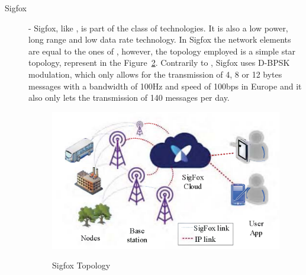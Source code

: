 \begin{description}
\begin{figure}[H]
                  \label{fig:lora_topology}
            \end{figure}
      \item[Sigfox] - Sigfox, like , is part of the  class
            of technologies. It is also a low power, long range and low data rate technology.
            In Sigfox the network elements are equal to the ones of , however,
            the topology employed is a simple star topology, represent in the
            Figure~\ref{fig:sigfox_topology}. Contrarily to , Sigfox uses
            \Gls{D-BPSK} modulation, which only allows for the transmission of 4, 8 or 12 bytes
            messages with a bandwidth of 100Hz and speed of 100bps in Europe and it also only
            lets the transmission of 140 messages per day.
            \begin{figure}[H]
                  \caption{Sigfox Topology \cite{Petrariu2021}}
                  \centering
                  \includegraphics[scale=0.7]{Chapters/Figures/sigfox topology.png}
                  \label{fig:sigfox_topology}
            \end{figure}
\end{description}

